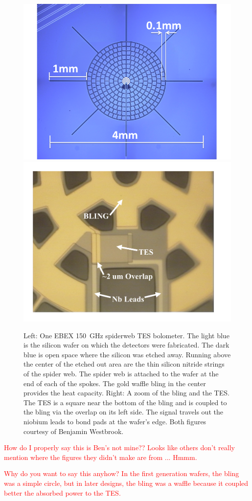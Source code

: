 \begin{figure}[ht!]
\begin{center}
\includegraphics[width=0.49\columnwidth]{figures/fullpixel1_v4_small_annotated.png}
\includegraphics[width=0.45\columnwidth]{figures/EBEX_BLINGTES_Annotated.png}
\caption{Left: One \ac{EBEX} 150~GHz spiderweb \ac{TES} bolometer. The light blue is the silicon wafer on which the detectors were fabricated. The dark blue is open space where the silicon was etched away. Running above the center of the etched out area are the thin silicon nitride strings of the spider web. The spider web is attached to the wafer at the end of each of the spokes. The gold waffle bling in the center provides the heat capacity. Right: A zoom of the bling and the \ac{TES}. The \ac{TES} is a square near the bottom of the bling and is coupled to the bling via the overlap on its left side. The signal travels out the niobium leads to bond pads at the wafer's edge. Both figures courtesy of Benjamin Westbrook. 
\label{fig:bolo_and_bling} }
\end{center}
\end{figure}

\textcolor{red}{How do I properly say this is Ben's not mine?? Looks like others don't really mention where the figures they didn't make are from ... Hmmm.}

\textcolor{red}{Why do you want to say this anyhow? In the first generation wafers, the bling was a simple circle, but in later designs, the bling was a waffle because it coupled better the absorbed power to the \ac{TES}.}


